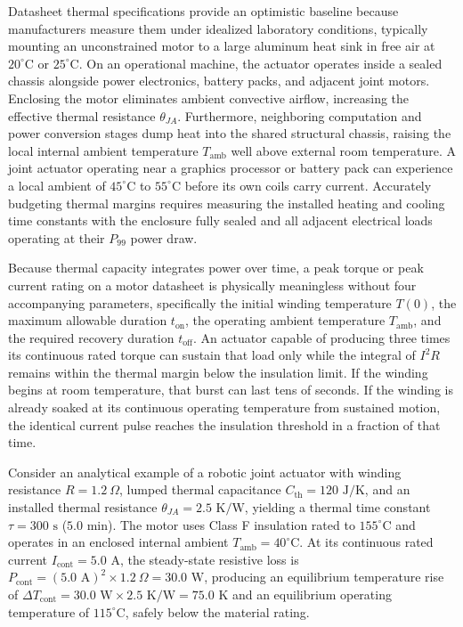 \documentclass[
  letterpaper,
  DIV=11,
  numbers=noendperiod]{scrartcl}
\begin{document}
Datasheet thermal specifications provide an optimistic baseline because
manufacturers measure them under idealized laboratory conditions,
typically mounting an unconstrained motor to a large aluminum heat sink
in free air at \(20^\circ\text{C}\) or \(25^\circ\text{C}\). On an
operational machine, the actuator operates inside a sealed chassis
alongside power electronics, battery packs, and adjacent joint motors.
Enclosing the motor eliminates ambient convective airflow, increasing
the effective thermal resistance \(\theta_{JA}\). Furthermore,
neighboring computation and power conversion stages dump heat into the
shared structural chassis, raising the local internal ambient
temperature \(T_{\text{amb}}\) well above external room temperature. A
joint actuator operating near a graphics processor or battery pack can
experience a local ambient of \(45^\circ\text{C}\) to
\(55^\circ\text{C}\) before its own coils carry current. Accurately
budgeting thermal margins requires measuring the installed heating and
cooling time constants with the enclosure fully sealed and all adjacent
electrical loads operating at their \(P_{99}\) power draw.

Because thermal capacity integrates power over time, a peak torque or
peak current rating on a motor datasheet is physically meaningless
without four accompanying parameters, specifically the initial winding
temperature \(T(0)\), the maximum allowable duration \(t_{\text{on}}\),
the operating ambient temperature \(T_{\text{amb}}\), and the required
recovery duration \(t_{\text{off}}\). An actuator capable of producing
three times its continuous rated torque can sustain that load only while
the integral of \(I^2 R\) remains within the thermal margin below the
insulation limit. If the winding begins at room temperature, that burst
can last tens of seconds. If the winding is already soaked at its
continuous operating temperature from sustained motion, the identical
current pulse reaches the insulation threshold in a fraction of that
time.

Consider an analytical example of a robotic joint actuator with winding
resistance \(R = 1.2\ \Omega\), lumped thermal capacitance
\(C_{\text{th}} = 120\text{ J/K}\), and an installed thermal resistance
\(\theta_{JA} = 2.5\text{ K/W}\), yielding a thermal time constant
\(\tau = 300\text{ s}\) (\(5.0\text{ min}\)). The motor uses Class F
insulation rated to \(155^\circ\text{C}\) and operates in an enclosed
internal ambient \(T_{\text{amb}} = 40^\circ\text{C}\). At its
continuous rated current \(I_{\text{cont}} = 5.0\text{ A}\), the
steady-state resistive loss is
\(P_{\text{cont}} = (5.0\text{ A})^2 \times 1.2\ \Omega = 30.0\text{ W}\),
producing an equilibrium temperature rise of
\(\Delta T_{\text{cont}} = 30.0\text{ W} \times 2.5\text{ K/W} = 75.0\text{ K}\)
and an equilibrium operating temperature of \(115^\circ\text{C}\),
safely below the material rating.
\end{document}
